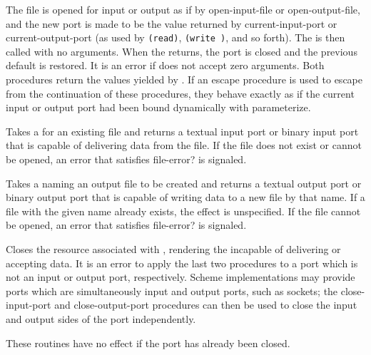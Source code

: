 \begin{entry}{
}

The file is opened for input or output
as if by {\cf open-input-file} or {\cf open-output-file},
and the new port is made to be the value returned by
{\cf current-input-port} or {\cf current-output-port}
(as used by {\tt (read)}, {\tt (write )}, and so forth).
The  is then called with no arguments.  When the  returns,
the port is closed and the previous default is restored.
It is an error if  does not accept zero arguments.
Both procedures return the values yielded by .
If an escape procedure
is used to escape from the continuation of these procedures, they
behave exactly as if the current input or output port had been bound
dynamically with {\cf parameterize}.


\end{entry}


\begin{entry}{
}

Takes a  for an existing file and returns a textual
input port or binary input port that is capable of delivering data from the
file.  If the file does not exist or cannot be opened, an error that satisfies {\cf file-error?} is signaled.

\end{entry}


\begin{entry}{
}

Takes a  naming an output file to be created and returns a
textual output port or binary output port that is capable of writing
data to a new file by that name.
If a file with the given name already exists,
the effect is unspecified.
If the file cannot be opened,
an error that satisfies {\cf file-error?} is signaled.

\end{entry}


\begin{entry}{
}

Closes the resource associated with , rendering the 
incapable of delivering or accepting data.
It is an error
to apply the last two procedures to a port which is not an input
or output port, respectively.
Scheme implementations may provide ports which are simultaneously
input and output ports, such as sockets; the {\cf close-input-port}
and {\cf close-output-port} procedures can then be used to close the
input and output sides of the port independently.

These routines have no effect if the port has already been closed.


\end{entry}

